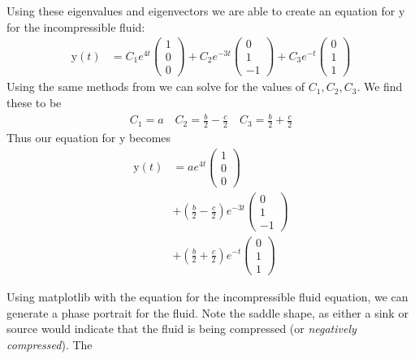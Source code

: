 \documentclass[10pt]{article}
\newenvironment{Figure}
{\par\medskip\noindent\minipage{\linewidth}}
{\endminipage\par\medskip}
\begin{document}
\begin{multicols}{2}
Using these eigenvalues and eigenvectors we are able to create an equation
for $\mathrm{y}$ for the incompressible fluid:
\begin{align*}
  \mathrm{y}\left(t\right) &= C_{1}e^{4t}\begin{pmatrix}1\\0\\0\end{pmatrix} +
  C_{2}e^{-3t}\begin{pmatrix}0\\1\\-1\end{pmatrix} +
  C_{3}e^{-t}\begin{pmatrix}0\\1\\1\end{pmatrix}
\end{align*}
Using the same methods from  we can solve for the
values of $C_1,C_2,C_3$. We find these to be
\begin{align*}
  C_1 = a \quad
  C_2 = \frac{b}{2}-\frac{c}{2} \quad
  C_3 = \frac{b}{2}+\frac{c}{2}
\end{align*}
Thus our equation for $\mathrm{y}$ becomes
\begin{align*}
  \mathrm{y}\left(t\right) &=
  ae^{4t}\begin{pmatrix}1\\0\\0\end{pmatrix}\\
  &+\left(\frac{b}{2}-\frac{c}{2}\right)e^{-3t}\begin{pmatrix}0\\1\\-1\end{pmatrix}\\
  &+\left(\frac{b}{2}+\frac{c}{2}\right)e^{-t}\begin{pmatrix}0\\1\\1\end{pmatrix}
\end{align*}

Using matplotlib with the equation for the incompressible fluid equation, we
can generate a phase portrait for the fluid. Note the saddle shape, as either
a sink or source would indicate that the fluid is being compressed (or
\textit{negatively compressed}). The 

\begin{Figure}
  \centering
  \def\svgwidth{\columnwidth}
  
  \label{fig:p1_1}
\end{Figure}


\end{multicols}
\end{document}
